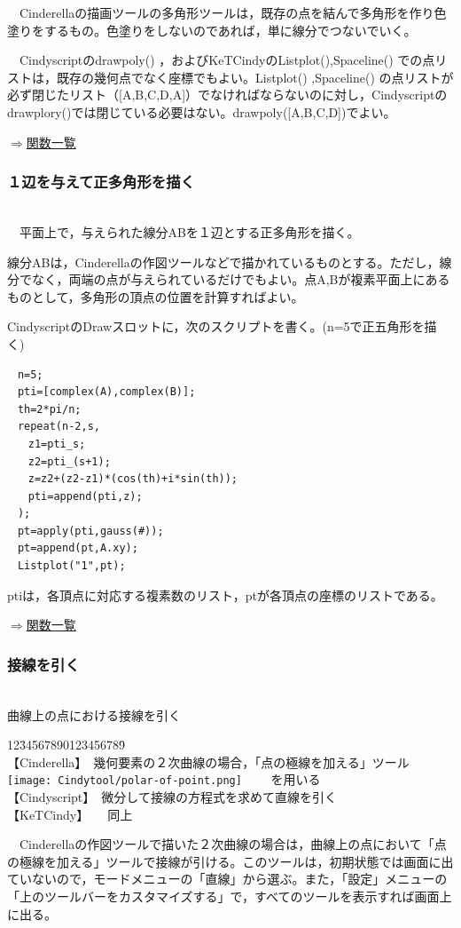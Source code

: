 \documentclass[papersize,a4paper,12pt,uplatex]{jsarticle}
\begin{document}
　Cinderellaの描画ツールの多角形ツールは，既存の点を結んで多角形を作り色塗りをするもの。色塗りをしないのであれば，単に線分でつないでいく。

　Cindyscriptのdrawpoly() ，およびKeTCindyのListplot(),Spaceline() での点リストは，既存の幾何点でなく座標でもよい。Listplot() ,Spaceline() の点リストが必ず閉じたリスト（[A,B,C,D,A]）でなければならないのに対し，Cindyscriptのdrawplory()では閉じている必要はない。drawpoly([A,B,C,D])でよい。
\begin{flushright} \hyperlink{functionlist3d}{$\Rightarrow$関数一覧}\end{flushright}


\subsubsection{１辺を与えて正多角形を描く}
　\\
　平面上で，与えられた線分ABを１辺とする正多角形を描く。

線分ABは，Cinderellaの作図ツールなどで描かれているものとする。ただし，線分でなく，両端の点が与えられているだけでもよい。点A,Bが複素平面上にあるものとして，多角形の頂点の位置を計算すればよい。

CindyscriptのDrawスロットに，次のスクリプトを書く。(n=5で正五角形を描く)
\begin{verbatim}
　n=5;
　pti=[complex(A),complex(B)];
　th=2*pi/n;
　repeat(n-2,s,
　　z1=pti_s;
　　z2=pti_(s+1);
　　z=z2+(z2-z1)*(cos(th)+i*sin(th));
　　pti=append(pti,z);
　);
　pt=apply(pti,gauss(#));
　pt=append(pt,A.xy);
　Listplot("1",pt);
\end{verbatim}
ptiは，各頂点に対応する複素数のリスト，ptが各頂点の座標のリストである。
\begin{flushright} \hyperlink{functionlist3d}{$\Rightarrow$関数一覧}\end{flushright}


\subsubsection{接線を引く}
　\\
曲線上の点における接線を引く
\begin{tabbing}
12\=34567890123456789\=\kill\\

\>【Cinderella】　\>幾何要素の２次曲線の場合，「点の極線を加える」ツール \texttt{[image: Cindytool/polar-of-point.png]}　　 を用いる\\ 
\>【Cindyscript】　\>微分して接線の方程式を求めて直線を引く\\
 \>【KeTCindy】　　\>同上　\\
\end{tabbing}
　Cinderellaの作図ツールで描いた２次曲線の場合は，曲線上の点において「点の極線を加える」ツールで接線が引ける。このツールは，初期状態では画面に出ていないので，モードメニューの「直線」から選ぶ。また，「設定」メニューの「上のツールバーをカスタマイズする」で，すべてのツールを表示すれば画面上に出る。
\end{document}
